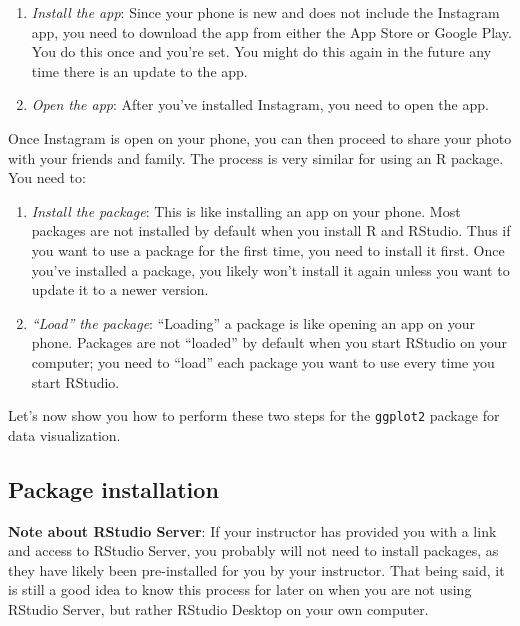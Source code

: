 \documentclass[12pt, krantz2,]{krantz}
\providecommand{\tightlist}{%
  \setlength{\itemsep}{0pt}\setlength{\parskip}{0pt}}
\renewenvironment{quote}{\begin{VF}}{\end{VF}}
\begin{document}
\begin{enumerate}
\def\labelenumi{\arabic{enumi}.}
\tightlist
\item
  \emph{Install the app}: Since your phone is new and does not include the Instagram app, you need to download the app from either the App Store or Google Play. You do this once and you're set. You might do this again in the future any time there is an update to the app.
\item
  \emph{Open the app}: After you've installed Instagram, you need to open the app.
\end{enumerate}

Once Instagram is open on your phone, you can then proceed to share your photo with your friends and family. The process is very similar for using an R package. You need to:

\begin{enumerate}
\def\labelenumi{\arabic{enumi}.}
\tightlist
\item
  \emph{Install the package}: This is like installing an app on your phone. Most packages are not installed by default when you install R and RStudio. Thus if you want to use a package for the first time, you need to install it first. Once you've installed a package, you likely won't install it again unless you want to update it to a newer version.
\item
  \emph{``Load'' the package}: ``Loading'' a package is like opening an app on your phone. Packages are not ``loaded'' by default when you start RStudio on your computer; you need to ``load'' each package you want to use every time you start RStudio.
\end{enumerate}

Let's now show you how to perform these two steps for the \texttt{ggplot2} package for data visualization.

\hypertarget{package-installation}{%
\subsection{Package installation}\label{package-installation}}

\begin{quote}
\textbf{Note about RStudio Server}: If your instructor has provided you with a link and access to RStudio Server, you probably will not need to install packages, as they have likely been pre-installed for you by your instructor. That being said, it is still a good idea to know this process for later on when you are not using RStudio Server, but rather RStudio Desktop on your own computer.
\end{quote}
\end{document}
